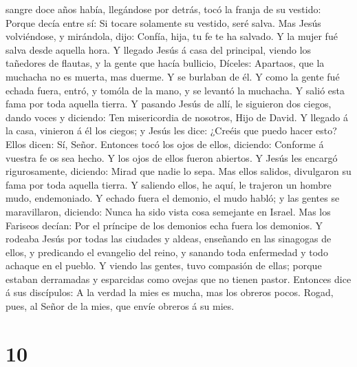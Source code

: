 sangre doce años había, llegándose por detrás, tocó la franja de su
vestido:  Porque decía entre sí: Si tocare solamente su
vestido, seré salva.  Mas Jesús volviéndose, y mirándola,
dijo: Confía, hija, tu fe te ha salvado. Y la mujer fué salva desde
aquella hora.  Y llegado Jesús á casa del principal, viendo
los tañedores de flautas, y la gente que hacía bullicio, 
Díceles: Apartaos, que la muchacha no es muerta, mas duerme. Y se
burlaban de él.  Y como la gente fué echada fuera, entró, y
tomóla de la mano, y se levantó la muchacha.  Y salió esta
fama por toda aquella tierra.  Y pasando Jesús de allí, le
siguieron dos ciegos, dando voces y diciendo: Ten misericordia de
nosotros, Hijo de David.  Y llegado á la casa, vinieron á
él los ciegos; y Jesús les dice: ¿Creéis que puedo hacer esto? Ellos
dicen: Sí, Señor.  Entonces tocó los ojos de ellos,
diciendo: Conforme á vuestra fe os sea hecho.  Y los ojos
de ellos fueron abiertos. Y Jesús les encargó rigurosamente, diciendo:
Mirad que nadie lo sepa.  Mas ellos salidos, divulgaron su
fama por toda aquella tierra.  Y saliendo ellos, he aquí,
le trajeron un hombre mudo, endemoniado.  Y echado fuera el
demonio, el mudo habló; y las gentes se maravillaron, diciendo: Nunca ha
sido vista cosa semejante en Israel.  Mas los Fariseos
decían: Por el príncipe de los demonios echa fuera los demonios.
 Y rodeaba Jesús por todas las ciudades y aldeas, enseñando
en las sinagogas de ellos, y predicando el evangelio del reino, y
sanando toda enfermedad y todo achaque en el pueblo.  Y
viendo las gentes, tuvo compasión de ellas; porque estaban derramadas y
esparcidas como ovejas que no tienen pastor.  Entonces dice
á sus discípulos: A la verdad la mies es mucha, mas los obreros pocos.
 Rogad, pues, al Señor de la mies, que envíe obreros á su
mies.

\hypertarget{section-9}{%
\section{10}\label{section-9}}


